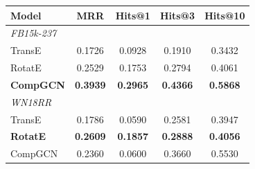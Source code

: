 \begin{tabular}{lcccc}
\toprule
\textbf{Model} & \textbf{MRR} & \textbf{Hits@1} & \textbf{Hits@3} & \textbf{Hits@10} \\
\midrule
\multicolumn{5}{l}{\emph{FB15k-237}} \\
TransE & 0.1726 & 0.0928 & 0.1910 & 0.3432 \\
RotatE & 0.2529 & 0.1753 & 0.2794 & 0.4061 \\
\textbf{CompGCN} & \textbf{0.3939} & \textbf{0.2965} & \textbf{0.4366} & \textbf{0.5868} \\
\midrule
\multicolumn{5}{l}{\emph{WN18RR}} \\
TransE & 0.1786 & 0.0590 & 0.2581 & 0.3947 \\
\textbf{RotatE} & \textbf{0.2609} & \textbf{0.1857} & \textbf{0.2888} & \textbf{0.4056} \\
CompGCN & 0.2360 & 0.0600 & 0.3660 & 0.5530 \\
\bottomrule
\end{tabular}
